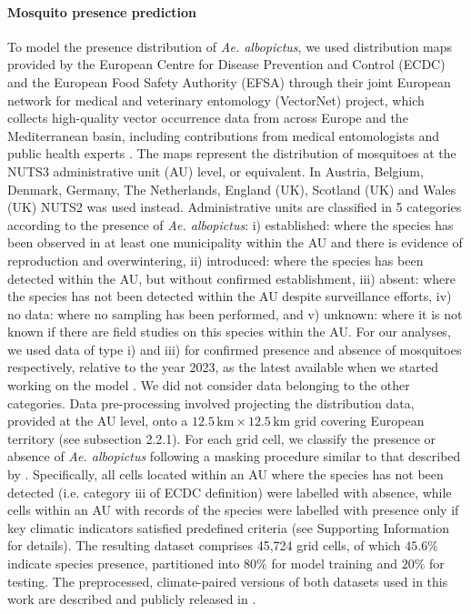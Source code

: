 \documentclass[preprint,12pt]{elsarticle}
\begin{document}
\paragraph{Mosquito presence prediction}
To model the presence distribution of \emph{Ae. albopictus}, we used distribution maps \cite{ecdc2024b} provided by the European Centre for Disease Prevention and Control (ECDC)  and the European Food Safety Authority (EFSA) through their joint European network for medical and veterinary entomology (VectorNet) project, which collects high-quality vector occurrence data from across Europe and the Mediterranean basin, including contributions from medical entomologists and public health experts \cite{Wint2023}. 
The maps represent the distribution of mosquitoes at the NUTS3 administrative unit (AU) level, or equivalent. In Austria, Belgium, Denmark, Germany, The Netherlands, England (UK), Scotland (UK) and Wales (UK) NUTS2 was used instead. Administrative units are classified in 5 categories according to the presence of \emph{Ae. albopictus}: i) established: where the species has been observed in at least one municipality within the AU and there is evidence of reproduction and overwintering, ii) introduced: where the species has been detected within the AU, but without confirmed establishment, iii) absent: where the species has not been detected within the AU despite surveillance efforts, iv) no data: where no sampling has been performed, and v) unknown: where it is not known if there are field studies on this species within the AU. For our analyses, we used data of type i) and iii) for confirmed presence and absence of mosquitoes respectively, relative to the year 2023, as the latest available when we started working on the model \cite{biazzo2026_datasets}. We did not consider data belonging to the other categories.
Data pre-processing involved projecting the distribution data, provided at the AU level, onto a $12.5\,\text{km} \times 12.5\,\text{km}$ grid covering European territory (see subsection 2.2.1). 
For each grid cell, we classify the presence or absence of \emph{Ae. albopictus} following a masking procedure similar to that described by \cite{zardini2024}. Specifically, all cells located within an AU where the species has not been detected (i.e. category iii of ECDC definition) were labelled with absence, while cells within an AU with records of the species were labelled with presence only if key climatic indicators satisfied predefined criteria (see Supporting Information for details).
The resulting dataset comprises 45,724 grid cells, of which $45.6\%$ indicate species presence, partitioned into $80\%$ for model training and $20\%$ for testing. The preprocessed, climate-paired versions of both datasets used in this work are described and publicly released in \cite{biazzo2026_datasets}.
 
\end{document}
